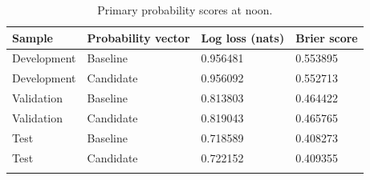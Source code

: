\begin{table}[htbp]\centering
{\fontsize{10}{12}\selectfont\renewcommand{\arraystretch}{1.18}\setlength{\tabcolsep}{4pt}
\begin{tabularx}{\linewidth}{@{}L{37mm}L{44mm}C{40mm}X@{}}\toprule{}
\textbf{Sample} & \textbf{Probability vector} & \textbf{Log loss (nats)} & \textbf{Brier score} \\ \midrule
Development & Baseline & 0.956481 & 0.553895 \\ \hline
Development & Candidate & 0.956092 & 0.552713 \\ \hline
Validation & Baseline & 0.813803 & 0.464422 \\ \hline
Validation & Candidate & 0.819043 & 0.465765 \\ \hline
Test & Baseline & 0.718589 & 0.408273 \\ \hline
Test & Candidate & 0.722152 & 0.409355 \\ \hline
{}\bottomrule\end{tabularx}}
\caption[Primary probability scores at noon]{Primary probability scores at noon.}\label{tab:scores}
\end{table}
